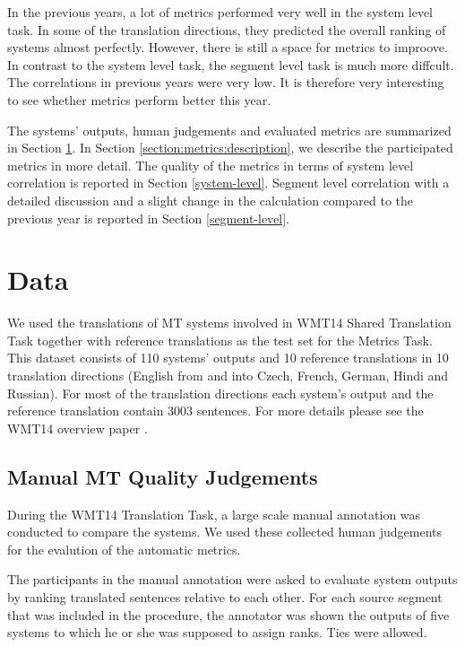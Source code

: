 In the previous years, a lot of metrics performed very well in the system level
task. In some of the translation directions, they predicted the overall ranking
of systems almost perfectly. However, there is still a space for metrics to
improove.  In contrast to the system level task, the segment level task is much
more diffcult. The correlations in previous years were very low. It is
therefore very interesting to see whether metrics perform better this year.

The systems' outputs, human judgements and evaluated metrics are summarized in
Section \ref{section:data}. In Section \ref{section:metrics:description}, we
describe the participated metrics in more detail. The quality of the metrics
in terms of system level correlation is reported in Section \ref{system-level}.
Segment level correlation with a detailed discussion and a slight change in the
calculation compared to the previous year is reported in Section
\ref{segment-level}.

\section{Data}
\label{section:data}

We used the translations of MT systems involved in WMT14 Shared Translation
Task together with reference translations as the test set for the Metrics Task.
This dataset consists of 110 systems' outputs and 10 reference translations in
10 translation directions (English from and into Czech, French, German, Hindi
and Russian). For most of
the translation directions each system's output and the reference translation
contain 3003 sentences. For more details please see the WMT14 overview
paper . 

\subsection{Manual MT Quality Judgements}

During the WMT14 Translation Task, a large scale manual annotation was conducted
to compare the systems. We used these collected human judgements for the evalution
of
the automatic metrics. 

The participants in the manual annotation were asked to evaluate system outputs
by ranking translated sentences relative to each other. For each source segment
that was included in the procedure, the annotator was shown the outputs of five
systems to which he or she was supposed to assign ranks. Ties were allowed.

